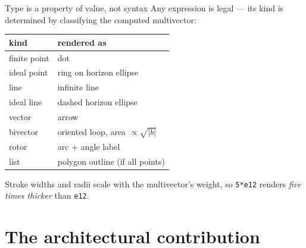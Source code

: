 \documentclass[aspectratio=169,11pt]{beamer}
\begin{document}
\begin{frame}{Type is a property of value, not syntax}
  Any expression is legal — its kind is determined by classifying the
  computed multivector:

  \begin{center}
  \begin{tabular}{ll}
    \toprule
    \textbf{kind} & \textbf{rendered as} \\
    \midrule
    finite point   & dot \\
    ideal point    & ring on horizon ellipse \\
    line           & infinite line \\
    ideal line     & dashed horizon ellipse \\
    vector         & arrow \\
    bivector       & oriented loop, area \(\propto \sqrt{|b|}\) \\
    rotor          & arc + angle label \\
    list           & polygon outline (if all points) \\
    \bottomrule
  \end{tabular}
  \end{center}

  \vfill
  Stroke widths and radii scale with the multivector's weight, so
  \texttt{5*e12} renders \emph{five times thicker} than \texttt{e12}.
\end{frame}

\section{The architectural contribution}
\end{document}
